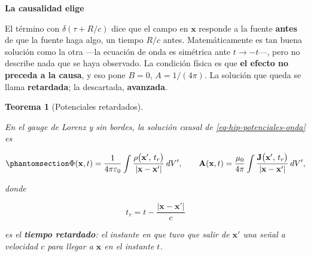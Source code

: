 \documentclass[
  spanish,
  a4paper,
]{scrbook}
\theoremstyle{definition}
\theoremstyle{plain}
\theoremstyle{definition}
\theoremstyle{plain}
\newtheorem{theorem}{Teorema}[chapter]
\theoremstyle{definition}
\theoremstyle{remark}
\begin{document}
\begin{tcolorbox}[enhanced jigsaw, arc=.35mm, bottomrule=.15mm, breakable, colback=white, colframe=quarto-callout-important-color-frame, left=2mm, leftrule=.75mm, opacityback=0, rightrule=.15mm, toprule=.15mm]
\begin{minipage}[t]{5.5mm}
\textcolor{quarto-callout-important-color}{\faExclamation}
\end{minipage}%
\begin{minipage}[t]{\textwidth - 5.5mm}

\vspace{-3mm}\textbf{La causalidad elige}\vspace{3mm}

El término con \(\delta(\tau + R/c)\) dice que el campo en \(\mathbf x\)
responde a la fuente \textbf{antes} de que la fuente haga algo, un
tiempo \(R/c\) antes. Matemáticamente es tan buena solución como la otra
---la ecuación de onda es simétrica ante \(t\to-t\)---, pero no describe
nada que se haya observado. La condición física es que \textbf{el efecto
no preceda a la causa}, y eso pone \(B = 0\), \(A = 1/(4\pi)\). La
solución que queda se llama \textbf{retardada}; la descartada,
\textbf{avanzada}.

\end{minipage}%
\end{tcolorbox}

\begin{theorem}[Potenciales
retardados]\protect\hypertarget{thm-hip-retardados}{}\label{thm-hip-retardados}

En el gauge de Lorenz y sin bordes, la solución causal de
\ref{eq-hip-potenciales-onda} es

\begin{equation}\protect\phantomsection\label{eq-hip-retardados}{
\Phi(\mathbf x,t) = \frac{1}{4\pi\varepsilon_0}\int\frac{\rho\big(\mathbf x',\,t_r\big)}{|\mathbf x-\mathbf x'|}\,dV',
\qquad
\mathbf A(\mathbf x,t) = \frac{\mu_0}{4\pi}\int\frac{\mathbf J\big(\mathbf x',\,t_r\big)}{|\mathbf x-\mathbf x'|}\,dV',
}\end{equation}

donde

\[
t_r = t - \frac{|\mathbf x - \mathbf x'|}{c}
\]

es el \textbf{tiempo retardado}: el instante en que tuvo que salir de
\(\mathbf x'\) una señal a velocidad \(c\) para llegar a \(\mathbf x\)
en el instante \(t\).

\end{theorem}
\end{document}
